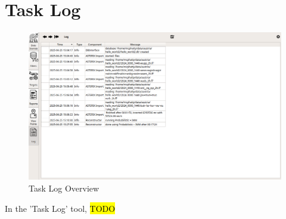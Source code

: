 
\section{Task Log}
\label{sec:task_log}

\begin{figure}[H]
    \hspace*{-2.5cm}
    \includegraphics[width=19cm,frame]{figures/task_log.png}
  \caption{Task Log Overview}
\end{figure}

In the 'Task Log' tool, \hl{TODO}
